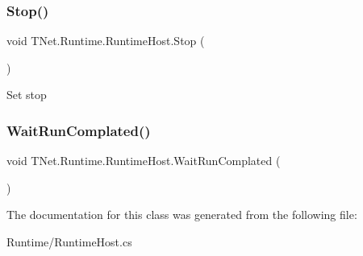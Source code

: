 \subsubsection{\texorpdfstring{Stop()}{Stop()}}
{\footnotesize\ttfamily void T\+Net.\+Runtime.\+Runtime\+Host.\+Stop (\begin{DoxyParamCaption}{ }\end{DoxyParamCaption})}



Set stop 

\mbox{\label{class_t_net_1_1_runtime_1_1_runtime_host_a5574eaa4bdb08cbd9ff781f27bfd3664}} 
\subsubsection{\texorpdfstring{Wait\+Run\+Complated()}{WaitRunComplated()}}
{\footnotesize\ttfamily void T\+Net.\+Runtime.\+Runtime\+Host.\+Wait\+Run\+Complated (\begin{DoxyParamCaption}{ }\end{DoxyParamCaption})}







The documentation for this class was generated from the following file\+:\begin{DoxyCompactItemize}
\item 
Runtime/Runtime\+Host.\+cs\end{DoxyCompactItemize}
